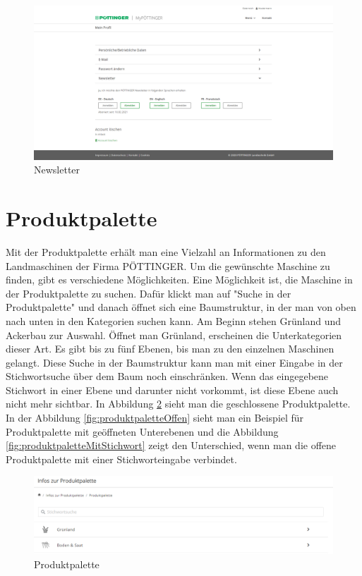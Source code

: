 \begin{figure}[H]
	\centerline{
		\includegraphics[width=1\textwidth, frame]{./grafiken/erm_profil_newsletter.png}
	}
	\vskip0pt
	\caption{Newsletter} \label{fig:newsletter}
\end{figure}

\section{Produktpalette}

Mit der Produktpalette erhält man eine Vielzahl an Informationen zu den Landmaschinen der Firma PÖTTINGER. Um die gewünschte Maschine zu finden, gibt es verschiedene Möglichkeiten. Eine Möglichkeit ist, die Maschine in der Produktpalette zu suchen. Dafür klickt man auf "Suche in der Produktpalette" und danach öffnet sich eine Baumstruktur, in der man von oben nach unten in den Kategorien suchen kann. Am Beginn stehen Grünland und Ackerbau zur Auswahl. Öffnet man Grünland, erscheinen die Unterkategorien dieser Art. Es gibt bis zu fünf Ebenen, bis man zu den einzelnen Maschinen gelangt. Diese Suche in der Baumstruktur kann man mit einer Eingabe in der Stichwortsuche über dem Baum noch einschränken. Wenn das eingegebene Stichwort in einer Ebene und darunter nicht vorkommt, ist diese Ebene auch nicht mehr sichtbar. In Abbildung \ref{fig:produktpalette} sieht man die geschlossene Produktpalette. In der Abbildung \ref{fig:produktpaletteOffen} sieht man ein Beispiel für Produktpalette mit geöffneten Unterebenen und die Abbildung \ref{fig:produktpaletteMitStichwort} zeigt den Unterschied, wenn man die offene Produktpalette mit einer Stichworteingabe verbindet.

\begin{figure}[H]
	\centerline{
		\includegraphics[width=1\textwidth, frame]{./grafiken/erm_produktpalette_neu_.png}
	}
	\vskip0pt
	\caption{Produktpalette} \label{fig:produktpalette}
\end{figure}

